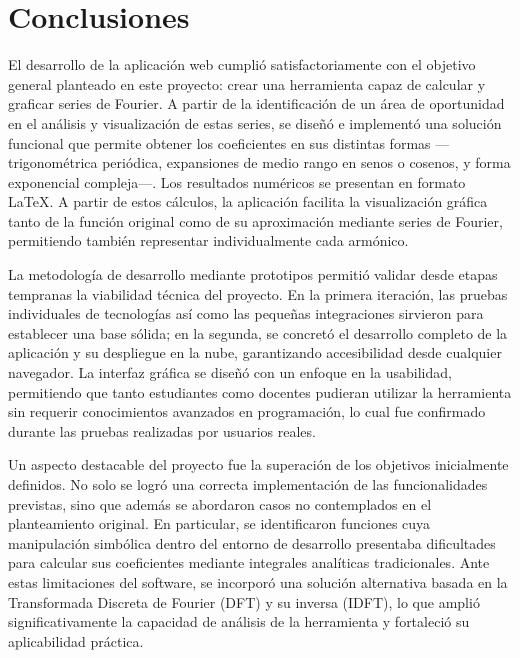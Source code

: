 \chapter{Conclusiones}\label{ch:Trabajo-a-futuro}
El desarrollo de la aplicación web cumplió satisfactoriamente con el objetivo general planteado en este proyecto: crear una herramienta capaz de calcular y graficar series de Fourier. A partir de la identificación de un área de oportunidad en el análisis y visualización de estas series, se diseñó e implementó una solución funcional que permite obtener los coeficientes en sus distintas formas —trigonométrica periódica, expansiones de medio rango en senos o cosenos, y forma exponencial compleja—. Los resultados numéricos se presentan en formato LaTeX. A partir de estos cálculos, la aplicación facilita la visualización gráfica tanto de la función original como de su aproximación mediante series de Fourier, permitiendo también representar individualmente cada armónico.

La metodología de desarrollo mediante prototipos permitió validar desde etapas tempranas la viabilidad técnica del proyecto. En la primera iteración, las pruebas individuales de tecnologías así como las pequeñas integraciones sirvieron para establecer una base sólida; en la segunda, se concretó el desarrollo completo de la aplicación y su despliegue en la nube, garantizando accesibilidad desde cualquier navegador. La interfaz gráfica se diseñó con un enfoque en la usabilidad, permitiendo que tanto estudiantes como docentes pudieran utilizar la herramienta sin requerir conocimientos avanzados en programación, lo cual fue confirmado durante las pruebas realizadas por usuarios reales.

Un aspecto destacable del proyecto fue la superación de los objetivos inicialmente definidos. No solo se logró una correcta implementación de las funcionalidades previstas, sino que además se abordaron casos no contemplados en el planteamiento original. En particular, se identificaron funciones cuya manipulación simbólica dentro del entorno de desarrollo presentaba dificultades para calcular sus coeficientes mediante integrales analíticas tradicionales. Ante estas limitaciones del software, se incorporó una solución alternativa basada en la Transformada Discreta de Fourier (DFT) y su inversa (IDFT), lo que amplió significativamente la capacidad de análisis de la herramienta y fortaleció su aplicabilidad práctica.



